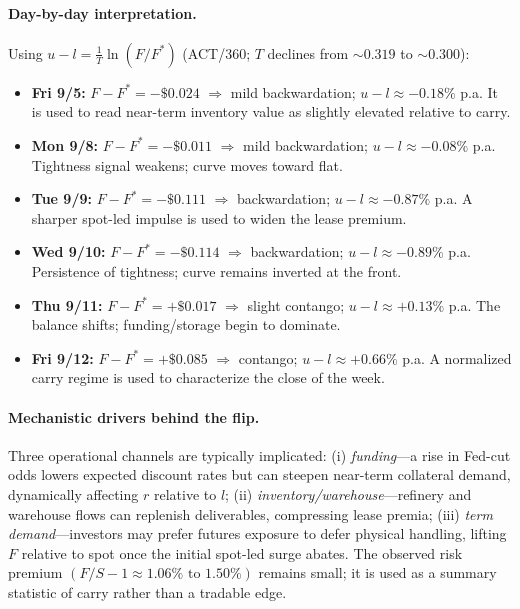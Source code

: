 \documentclass[10pt,a4paper]{article} %
\begin{document}
\paragraph{Day-by-day interpretation.}
Using \(u-l=\frac{1}{T}\ln(F/F^{*})\) (ACT/360; \(T\) declines from \(\sim 0.319\) to \(\sim 0.300\)):
\begin{itemize}
  \item \textbf{Fri 9/5:} \(F-F^{*}=-\$0.024\) \(\Rightarrow\) mild backwardation; \(u-l\approx-0.18\%\) p.a. It is used to read near-term inventory value as slightly elevated relative to carry.
  \item \textbf{Mon 9/8:} \(F-F^{*}=-\$0.011\) \(\Rightarrow\) mild backwardation; \(u-l\approx-0.08\%\) p.a. Tightness signal weakens; curve moves toward flat.
  \item \textbf{Tue 9/9:} \(F-F^{*}=-\$0.111\) \(\Rightarrow\) backwardation; \(u-l\approx-0.87\%\) p.a. A sharper spot-led impulse is used to widen the lease premium.
  \item \textbf{Wed 9/10:} \(F-F^{*}=-\$0.114\) \(\Rightarrow\) backwardation; \(u-l\approx-0.89\%\) p.a. Persistence of tightness; curve remains inverted at the front.
  \item \textbf{Thu 9/11:} \(F-F^{*}=+\$0.017\) \(\Rightarrow\) slight contango; \(u-l\approx+0.13\%\) p.a. The balance shifts; funding/storage begin to dominate.
  \item \textbf{Fri 9/12:} \(F-F^{*}=+\$0.085\) \(\Rightarrow\) contango; \(u-l\approx+0.66\%\) p.a. A normalized carry regime is used to characterize the close of the week.
\end{itemize}

\paragraph{Mechanistic drivers behind the flip.}
Three operational channels are typically implicated: (i) \emph{funding}—a rise in Fed-cut odds lowers expected discount rates but can steepen near-term collateral demand, dynamically affecting \(r\) relative to \(l\); (ii) \emph{inventory/warehouse}—refinery and warehouse flows can replenish deliverables, compressing lease premia; (iii) \emph{term demand}—investors may prefer futures exposure to defer physical handling, lifting \(F\) relative to spot once the initial spot-led surge abates. The observed risk premium \((F/S-1\approx 1.06\% \text{ to } 1.50\%)\) remains small; it is used as a summary statistic of carry rather than a tradable edge.
\end{document}

